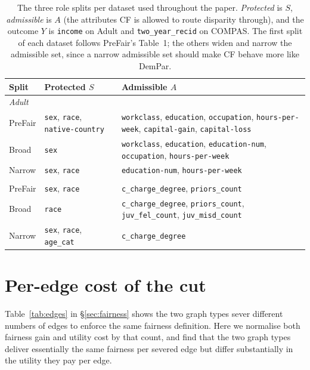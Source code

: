 \documentclass{article}
\begin{document}
\begin{table}[h]
  \caption{The three role splits per dataset used throughout the paper.
  \emph{Protected} is $S$, \emph{admissible} is $A$ (the attributes CF is
  allowed to route disparity through), and the outcome $Y$ is
  \texttt{income} on Adult and \texttt{two\_year\_recid} on COMPAS. The
  first split of each dataset follows PreFair's Table~1; the others widen
  and narrow the admissible set, since a narrow admissible set should make
  CF behave more like DemPar.}
  \label{tab:roles}
  \centering
  \footnotesize
  \setlength{\tabcolsep}{4pt}
  \begin{tabular}{@{}l p{} p{}@{}}
    \toprule
    Split & Protected $S$ & Admissible $A$ \\
    \midrule
    \multicolumn{3}{l}{\textit{Adult}} \\
    PreFair       & \texttt{sex}, \texttt{race}, \texttt{native-country} & \texttt{workclass}, \texttt{education}, \texttt{occupation}, \texttt{hours-per-week}, \texttt{capital-gain}, \texttt{capital-loss} \\
    Broad         & \texttt{sex} & \texttt{workclass}, \texttt{education}, \texttt{education-num}, \texttt{occupation}, \texttt{hours-per-week} \\
    Narrow        & \texttt{sex}, \texttt{race} & \texttt{education-num}, \texttt{hours-per-week} \\
    \addlinespace[2pt]
    \multicolumn{3}{l}{\textit{COMPAS}} \\
    PreFair       & \texttt{sex}, \texttt{race} & \texttt{c\_charge\_degree}, \texttt{priors\_count} \\
    Broad         & \texttt{race} & \texttt{c\_charge\_degree}, \texttt{priors\_count}, \texttt{juv\_fel\_count}, \texttt{juv\_misd\_count} \\
    Narrow        & \texttt{sex}, \texttt{race}, \texttt{age\_cat} & \texttt{c\_charge\_degree} \\
    \bottomrule
  \end{tabular}
\end{table}

\section{Per-edge cost of the cut}
\label{app:per_edge_cost}

Table~\ref{tab:edges} in \S\ref{sec:fairness} shows the two graph types
sever different numbers of edges to enforce the same fairness definition.
Here we normalise both fairness gain and utility cost by that count, and
find that the two graph types deliver essentially the same fairness per
severed edge but differ substantially in the utility they pay per edge.
\end{document}
